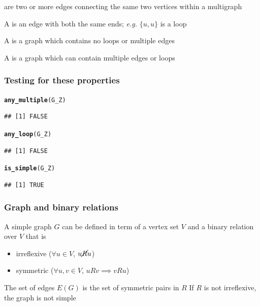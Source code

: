\documentclass[aspectratio=169]{beamer}\usepackage[]{graphicx}\usepackage[]{xcolor}
\makeatletter
\newcommand{\hldef}[1]{\textcolor[rgb]{0.345,0.345,0.345}{#1}}%
\newcommand{\hlkwd}[1]{\textcolor[rgb]{0.737,0.353,0.396}{\textbf{#1}}}%
\newenvironment{kframe}{%
 \def\at@end@of@kframe{}%
 \ifinner\ifhmode%
  \def\at@end@of@kframe{\end{minipage}}%
  \begin{minipage}{\columnwidth}%
 \fi\fi%
 \def\FrameCommand##1{\hskip\@totalleftmargin \hskip-\fboxsep
 \colorbox{shadecolor}{##1}\hskip-\fboxsep
     \hskip-\linewidth \hskip-\@totalleftmargin \hskip\columnwidth}%
 \MakeFramed {\advance\hsize-\width
   \@totalleftmargin\z@ \linewidth\hsize
   \@setminipage}}%
 {\par\unskip\endMakeFramed%
 \at@end@of@kframe}
\newenvironment{knitrout}{}{} %
\makeatother
\begin{document}
\begin{frame}
	\begin{definition}
	 are two or more edges connecting the same two vertices within a multigraph
	\end{definition}
	\vfill
	\begin{definition}[Loop]
	A  is an edge with both the same ends; \emph{e.g.} $\{u,u\}$ is a loop
	\end{definition}
	\vfill
	\begin{definition}
		A  is a graph which contains no loops or multiple edges
	\end{definition}
	\vfill
	\begin{definition}[Multigraph]
		A  is a graph which can contain multiple edges or loops
	\end{definition}
\end{frame}


\begin{frame}[fragile]\frametitle{Testing for these properties}
\begin{knitrout}
\color{fgcolor}\begin{kframe}
\begin{alltt}
\hlkwd{any_multiple}\hldef{(G_Z)}
\end{alltt}
\begin{verbatim}
## [1] FALSE
\end{verbatim}
\begin{alltt}
\hlkwd{any_loop}\hldef{(G_Z)}
\end{alltt}
\begin{verbatim}
## [1] FALSE
\end{verbatim}
\begin{alltt}
\hlkwd{is_simple}\hldef{(G_Z)}
\end{alltt}
\begin{verbatim}
## [1] TRUE
\end{verbatim}
\end{kframe}
\end{knitrout}
\end{frame}



\begin{frame}\frametitle{Graph and binary relations}
A simple graph $G$ can be defined in term of a vertex set $V$ and a binary relation over $V$ that is
	\begin{itemize}
		\item irreflexive ($\forall u\in V$, $u\cancel Ru$)
		\item symmetric ($\forall u,v\in V$, $uRv\implies vRu$)
	\end{itemize}
	\vfill
	The set of edges $E(G)$ is the set of symmetric pairs in $R$
	\vfill
	If $R$ is not irreflexive, the graph is not simple
\end{frame}
\end{document}
